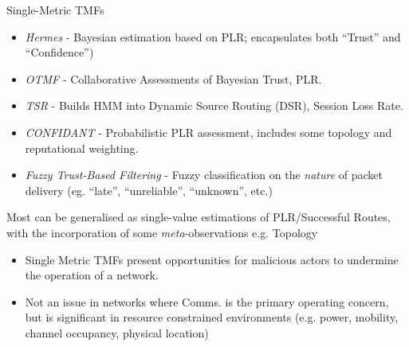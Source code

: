 \documentclass{beamer}
\begin{document}
\begin{frame}[allowframebreaks]{Single-Metric TMFs}
  \begin{itemize}
    \item \emph{Hermes} \autocite{Zouridaki2005} - Bayesian estimation based on PLR; encapsulates both ``Trust'' and ``Confidence'')
    \item \emph{OTMF} \autocite{Li2008} - Collaborative Assessments of Bayesian Trust, PLR.
    \item \emph{TSR} \autocite{Moe2008a} - Builds HMM into Dynamic Source Routing (DSR), Session Loss Rate.
    \item \emph{CONFIDANT} \autocite{Buchegger2002} - Probabilistic PLR assessment, includes some topology and reputational weighting.
    \item \emph{Fuzzy Trust-Based Filtering} \autocite{Luo2008} - Fuzzy classification on the \emph{nature} of packet delivery (eg. ``late'', ``unreliable'', ``unknown'', etc.)
  \end{itemize}
  Most can be generalised as single-value estimations of PLR/Successful Routes, with the incorporation of some \emph{meta}-observations e.g. Topology
  \framebreak
  \begin{itemize}
  \item
    Single Metric TMFs present opportunities for malicious actors to undermine the operation of a network. 
  \item 
    Not an issue in networks where Comms. is the primary operating concern, but is significant in resource constrained environments (e.g. power, mobility, channel occupancy, physical location)
  \end{itemize}

\end{frame}
\end{document}
